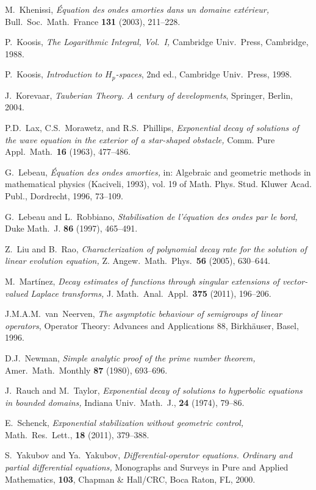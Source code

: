 \documentclass[11pt]{amsart}
\theoremstyle{definition}
\theoremstyle{remark}
\numberwithin{equation}{section}
\begin{document}
\begin{thebibliography}{100}
 M.~Khenissi, \emph{\'Equation des ondes amorties dans un domaine ext\'erieur,} Bull.\ Soc.\ Math.\ France \textbf{131} (2003), 211--228.

 P.~Koosis, \emph{The Logarithmic Integral, Vol.\ I,} Cambridge Univ.\ Press, Cambridge, 1988.

 P.~Koosis, \emph{Introduction to $H_p$-spaces}, 2nd ed., Cambridge Univ.\ Press, 1998.

 J.~Korevaar, \emph{Tauberian Theory. A century of developments}, Springer, Berlin, 2004.

 P.D.~Lax, C.S.~Morawetz, and R.S.~Phillips, \emph{Exponential decay of solutions of the wave equation in the
exterior of a star-shaped obstacle,} Comm. Pure Appl.\ Math.\ \textbf{16} (1963), 477--486.

 G.~Lebeau, \emph{\' Equation des ondes amorties,} in: Algebraic and geometric methods in mathematical physics (Kaciveli, 1993),
vol. 19 of Math. Phys. Stud. Kluwer Acad. Publ., Dordrecht, 1996, 73--109.

 G.~Lebeau and L.~Robbiano, \emph{ Stabilisation de l'\'equation des ondes par le bord,} Duke Math.\ J. \textbf{86} (1997), 465--491.

 Z.~Liu and B.~Rao, \emph{ Characterization of polynomial decay rate for the solution of linear evolution equation,} Z. Angew.\ Math.\
Phys.\ \textbf{56} (2005), 630--644.

 M.~Mart\'inez, \emph{Decay estimates of functions through singular extensions of vector-valued Laplace transforms,} J. Math.\ Anal.\ Appl.\
\textbf{375} (2011), 196--206.

 J.M.A.M.~van~Neerven, \emph{The asymptotic behaviour of semigroups of linear operators},  Operator Theory: Advances and
Applications 88, Birkh\" auser, Basel, 1996.

 D.J.~Newman, \emph{Simple analytic proof of the prime number theorem,} Amer.\ Math.\ Monthly \textbf{87} (1980), 693--696.

\bibitem{RaTa74} J.~Rauch and M.~Taylor, \emph{Exponential decay of solutions to hyperbolic equations in bounded domains,} Indiana Univ.\ Math.\ J.,
\textbf{24} (1974), 79--86.

 E.~Schenck, \emph{Exponential stabilization without geometric control,} Math.\ Res.\ Lett., \textbf{18} (2011), 379--388.

\bibitem{Yak99} S.~Yakubov and Ya.~Yakubov, \emph{Differential-operator equations. Ordinary and partial differential equations,} Monographs and
Surveys in Pure and Applied Mathematics, \textbf{103}, Chapman \& Hall/CRC, Boca Raton, FL, 2000.

\end{thebibliography}
\end{document}
